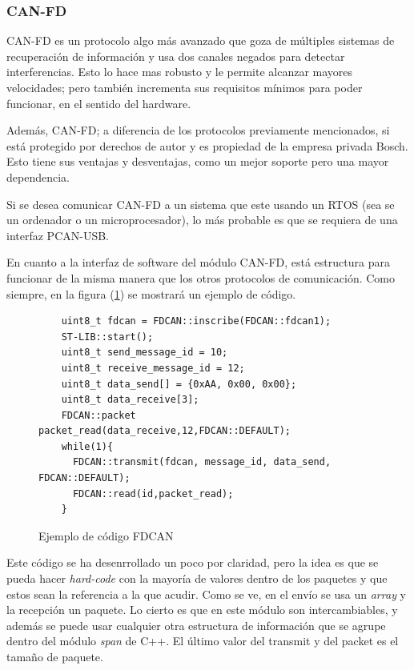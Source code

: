 \documentclass{report}
\begin{document}
\subsubsection{CAN-FD}
CAN-FD\cite{web:CANFD:CiA} es un protocolo algo más avanzado que goza de múltiples sistemas de recuperación de información y usa dos canales negados para detectar interferencias. Esto lo hace mas robusto y le permite alcanzar mayores velocidades; pero también incrementa sus requisitos mínimos para poder funcionar, en el sentido del hardware. 
\par 
Además, CAN-FD; a diferencia de los protocolos previamente mencionados, si está protegido por derechos de autor y es propiedad de la empresa privada Bosch. Esto tiene sus ventajas y desventajas, como un mejor soporte pero una mayor dependencia. 
\par \vspace{0.3cm}
Si se desea comunicar CAN-FD a un sistema que este usando un RTOS (sea se un ordenador o un microprocesador), lo más probable es que se requiera de una interfaz PCAN-USB. 
\par \vspace{0.3cm}
En cuanto a la interfaz de software del módulo CAN-FD, está estructura para funcionar de la misma manera que los otros protocolos de comunicación. Como siempre, en la figura (\ref{FDCANcode}) se mostrará un ejemplo de código. 

\begin{figure}[h]
  \begin{lstlisting}
    uint8_t fdcan = FDCAN::inscribe(FDCAN::fdcan1);
    ST-LIB::start();
    uint8_t send_message_id = 10;
    uint8_t receive_message_id = 12;
    uint8_t data_send[] = {0xAA, 0x00, 0x00}; 
    uint8_t data_receive[3]; 
    FDCAN::packet packet_read(data_receive,12,FDCAN::DEFAULT);
    while(1){
      FDCAN::transmit(fdcan, message_id, data_send, FDCAN::DEFAULT);
      FDCAN::read(id,packet_read);
    }
  \end{lstlisting}
  \caption{Ejemplo de código FDCAN}
  \label{FDCANcode}
  \end{figure}

Este código se ha desenrrollado un poco por claridad, pero la idea es que se pueda hacer \textit{hard-code} con la mayoría de valores dentro de los paquetes y que estos sean la referencia a la que acudir. Como se ve, en el envío se usa un \textit{array} y la recepción un paquete. Lo cierto es que en este módulo son intercambiables, y además se puede usar cualquier otra estructura de información que se agrupe dentro del módulo \textit{span} de C++. El último valor del transmit y del packet es el tamaño de paquete. 
\end{document}

